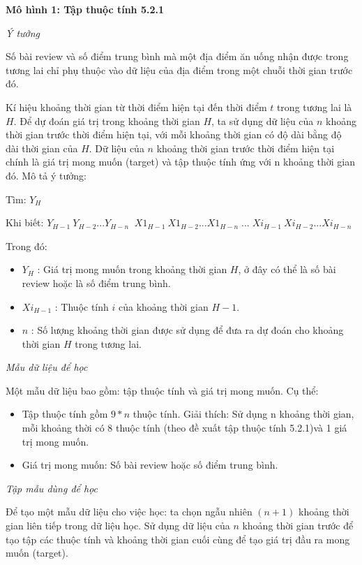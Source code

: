 \documentclass[12pt]{extarticle}
\begin{document}
			\par \textbf{Mô hình 1: Tập thuộc tính 5.2.1}
			\par \textit{Ý tưởng}
			\par Số bài review và số điểm trung bình mà một địa điểm ăn uống nhận được trong tương lai chỉ phụ thuộc vào dữ liệu của địa điểm trong một chuỗi thời gian trước đó.
			\par Kí hiệu khoảng thời gian từ thời điểm hiện tại đến thời điểm $t$ trong tương lai là $H$. Để dự đoán giá trị trong khoảng thời gian $H$, ta sử dụng dữ liệu của $n$ khoảng thời gian trước thời điểm hiện tại, với mỗi khoảng thời gian có độ dài bằng độ dài thời gian của $H$.  Dữ liệu của $n$ khoảng thời gian trước thời điểm hiện tại chính là giá trị mong muốn (target) và tập thuộc tính ứng với n khoảng thời gian đó. Mô tả ý tưởng:
				 \par \hspace{40pt}Tìm: \textbf{$Y_{H}$} \
				\par \hspace{40pt}Khi biết: $Y_{H-1}\:Y_{H-2}...Y_{H-n}\;\;X1_{H-1}\:X1_{H-2}...X1_{H-n}\;...\;Xi_{H-1}\:Xi_{H-2}...Xi_{H-n}$
			\par Trong đó:
				\begin{itemize}
					\item $  Y_{H}$ : Giá trị mong muốn trong khoảng thời gian $H$, ở đây có thể là số bài review hoặc là số điểm trung bình.
					\item $Xi_{H-1}$ : Thuộc tính $i$ của khoảng thời gian $H-1$.
					\item $n$ : Số lượng khoảng thời gian được sử dụng để đưa ra dự đoán cho khoảng thời gian $H$ trong tương lai.
				\end{itemize}
			\par \textit{Mẫu dữ liệu để học}
			\par Một mẫu dữ liệu bao gồm: tập thuộc tính và giá trị mong muốn. Cụ thể:
				\begin{itemize}
					\item Tập thuộc tính gồm $9*n$ thuộc tính. Giải thích: Sử dụng n khoảng thời gian, mỗi khoảng thời có 8 thuộc tính (theo đề xuất tập thuộc tính 5.2.1)và 1 giá trị mong muốn.  
					\item Giá trị mong muốn: Số bài review hoặc số điểm trung bình.
				\end{itemize}
			\par \textit{Tập mẫu dùng để học}
			\par Để tạo một mẫu dữ liệu cho việc học: ta chọn ngẫu nhiên $(n+1)$ khoảng thời gian liên tiếp trong dữ liệu học. Sử dụng dữ liệu của $n$ khoảng thời gian trước để tạo tập các thuộc tính và khoảng thời gian cuối cùng để tạo giá trị đầu ra mong muốn (target). 	 
\end{document}

